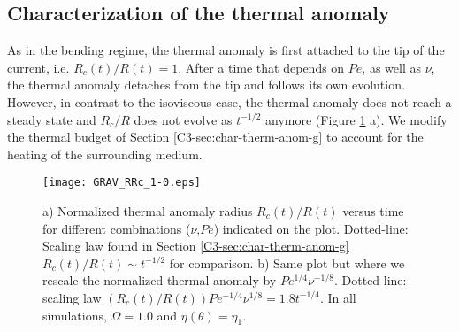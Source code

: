 \subsection{Characterization of the thermal anomaly}
\label{C4-sec:char-therm-anom-2}

As in the bending regime, the thermal anomaly is first attached to the
tip of the current, i.e. $R_c(t)/R(t)=1$. After a time that depends on
$Pe$, as well as $\nu$, the  thermal anomaly detaches from the tip and
follows  its own  evolution. However,  in contrast  to the  isoviscous
case, the  thermal anomaly does not  reach a steady state  and $R_c/R$
does     not     evolve      as     $t^{-1/2}$     anymore     (Figure
\ref{C4-GRAV_RRc_RArrhenius_1-0} a).  We modify  the thermal budget of
Section \ref{C3-sec:char-therm-anom-g}  to account for the  heating of
the surrounding medium.

\begin{figure}[h!]
  \begin{center}
    \graphicspath{ {/Users/thorey/Documents/These/Projet/Refroidissement/Skin_Model/Figure/Figure_Heating/} }
    \texttt{[image: GRAV\_RRc\_1-0.eps]}
    \caption{a) Normalized thermal anomaly radius $R_c(t)/R(t)$ versus
      time for  different combinations  ($\nu$,$Pe$) indicated  on the
      plot.     Dotted-line:   Scaling    law    found   in    Section
      \ref{C3-sec:char-therm-anom-g}  $R_c(t)/R(t)\sim  t^{-1/2}$  for
      comparison.  b)  Same plot but  where we rescale  the normalized
      thermal anomaly  by $Pe^{1/4}\nu^{-1/8}$.   Dotted-line: scaling
      law  $(R_c(t)/R(t))Pe^{-1/4}\nu^{1/8}=   1.8t^{-1/4}$.   In  all
      simulations, $\Omega=1.0$ and $\eta(\theta)=\eta_1$.}
    \label{C4-GRAV_RRc_RArrhenius_1-0}
  \end{center}
\end{figure}

